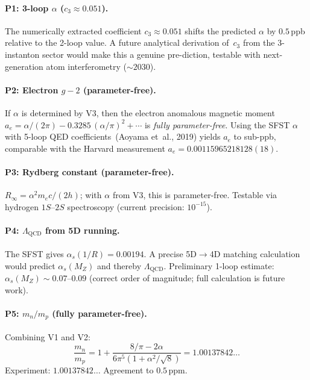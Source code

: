 \paragraph{P1: 3-loop $\alpha$ ($c_3\approx 0.051$).}
The numerically extracted coefficient $c_3\approx 0.051$ shifts the
predicted $\alpha$ by $0.5\,$ppb relative to the 2-loop value.  A
future analytical derivation of~$c_3$ from the 3-instanton sector
would make this a genuine pre-diction, testable with next-generation
atom interferometry ($\sim\!2030$).

\paragraph{P2: Electron $g\!-\!2$ (parameter-free).}
If $\alpha$ is determined by V3, then the electron anomalous magnetic
moment $a_e = \alpha/(2\pi) - 0.3285\,(\alpha/\pi)^2 + \cdots$ is
\emph{fully parameter-free}.  Using the SFST $\alpha$ with 5-loop
QED coefficients~(Aoyama et~al., 2019) yields $a_e$ to sub-ppb,
comparable with the Harvard measurement $a_e=0.00115965218128(18)$.

\paragraph{P3: Rydberg constant (parameter-free).}
$R_\infty = \alpha^2 m_e c/(2h)$; with $\alpha$ from V3, this is
parameter-free.  Testable via hydrogen $1S$--$2S$ spectroscopy
(current precision: $10^{-15}$).

\paragraph{P4: $\Lambda_{\mathrm{QCD}}$ from 5D running.}
The SFST gives $\alpha_s(1/R)=0.00194$.  A precise 5D$\to$4D matching
calculation would predict $\alpha_s(M_Z)$ and thereby $\Lambda_{\mathrm{QCD}}$.
Preliminary 1-loop estimate: $\alpha_s(M_Z)\sim 0.07$--$0.09$ (correct
order of magnitude; full calculation is future work).

\paragraph{P5: $m_n/m_p$ (fully parameter-free).}
Combining V1 and V2:
\begin{equation}
  \frac{m_n}{m_p}
  = 1 + \frac{8/\pi - 2\alpha}{6\pi^5(1+\alpha^2/\!\sqrt{8})}
  = 1.00137842\ldots
\end{equation}
Experiment: $1.00137842\ldots$ Agreement to $0.5\,$ppm.

